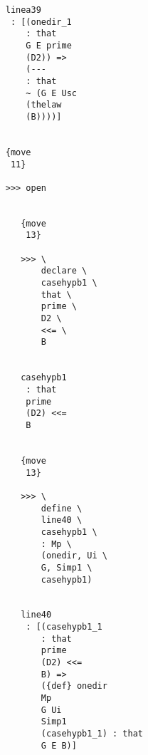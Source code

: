\documentclass[12pt]{article}
\begin{document}
\begin{verbatim}
                                    linea39 
                                     : [(onedir_1 
                                        : that 
                                        G E prime 
                                        (D2)) => 
                                        (--- 
                                        : that 
                                        ~ (G E Usc 
                                        (thelaw 
                                        (B))))]


                                    {move 
                                     11}

                                    >>> open


                                       {move 
                                        13}

                                       >>> \
                                           declare \
                                           casehypb1 \
                                           that \
                                           prime \
                                           D2 \
                                           <<= \
                                           B


                                       casehypb1 
                                        : that 
                                        prime 
                                        (D2) <<= 
                                        B


                                       {move 
                                        13}

                                       >>> \
                                           define \
                                           line40 \
                                           casehypb1 \
                                           : Mp \
                                           (onedir, Ui \
                                           G, Simp1 \
                                           casehypb1)


                                       line40 
                                        : [(casehypb1_1 
                                           : that 
                                           prime 
                                           (D2) <<= 
                                           B) => 
                                           ({def} onedir 
                                           Mp 
                                           G Ui 
                                           Simp1 
                                           (casehypb1_1) : that 
                                           G E B)]



\end{verbatim}
\end{document}
